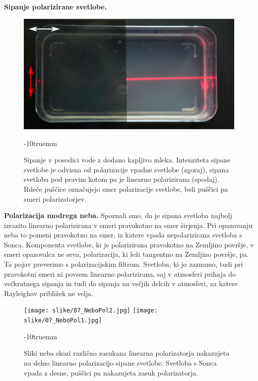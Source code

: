 \begin{example}{\bf Sipanje polarizirane svetlobe.}
\begin{figure}[!ht]
\includegraphics[width=7truecm]{slike/07_Mleko4.jpg}
\caption{Sipanje v posodici vode z dodano kapljivo mleka. Intenziteta sipane svetlobe je odvisna 
od polarizacije vpadne svetlobe (zgoraj), sipana svetloba pod pravim kotom pa je linearno
polarizirana (spodaj). Rdeče puščice označujejo smer polarizacije svetlobe, beli puščici
pa smeri polarizatorjev.}
\label{fig:07_mleko}
\vglue-10truemm
\end{figure}

\end{example}

\begin{example}{\bf Polarizacija modrega neba.}
Spoznali smo, da je sipana svetloba najbolj izrazito linearno polarizirana v smeri pravokotno na smer 
širjenja. Pri opazovanju neba to pomeni pravokotno na smer, iz katere vpada nepolarizirana
svetloba s Sonca. Komponenta svetlobe, ki je polarizirana pravokotno na Zemljino površje, 
v smeri opazovalca ne seva, polarizacija, ki leži tangentno na Zemljino površje, pa. Ta
pojav preverimo s polarizacijskim filtrom. Svetloba, ki jo zaznamo, tudi pri pravokotni smeri
ni povsem linearno polarizirana, saj v atmosferi prihaja do večkratnega sipanja in tudi do 
sipanja na večjih delcih v atmosferi, za katere Rayleighov približek ne velja.
\begin{figure}[!ht]
\centering
\texttt{[image: slike/07\_NeboPol2.jpg]}\hfill
\texttt{[image: slike/07\_NeboPol1.jpg]}
\caption{Sliki neba skozi različno zasukana linearna polarizatorja nakazujeta na delno
linearno polarizacijo sipane svetlobe. Svetloba s Sonca vpada z desne, puščici pa nakazujeta
zasuk polarizatorja.}
\label{fig:07_NeboPol}
\vglue-10truemm
\end{figure}

\end{example}

